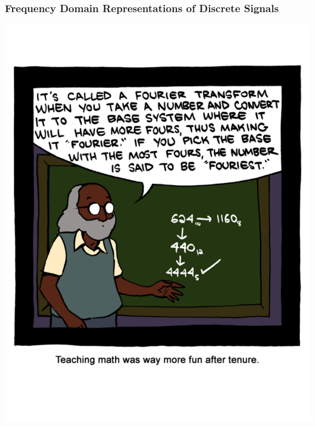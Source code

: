 \documentclass[mathserif,9pt]{beamer}
\begin{document}
\begin{frame}\frametitle{Frequency Domain Representations of Discrete Signals}\small
  \begin{center}
    \includegraphics[height=\textheight]{fourier.pdf}
  \end{center}
\end{frame}
\end{document}
